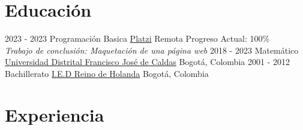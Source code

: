 \documentclass[letterpaper]{twentysecondcv} %
\begin{document}
\section{Educación}

\begin{twenty} %
	\twentyitem
    	{2023 - 2023}
        {Programación Basica}
        {\href{https://platzi.com/}{Platzi}}
        {Remota}
        {Progreso Actual: 100\% \\ \textit{Trabajo de conclusión: Maquetación de una página web}}
	\twentyitem
    	{2018 - 2023}
        {Matemático}
        {\href{https://www.udistrital.edu.co/inicio}{Universidad Distrital Francisco José de Caldas}}
        {Bogotá, Colombia}
        {}
	\twentyitem
    	{2001 - 2012}
        {Bachillerato}
        {\href{https://colegiosbogota.online/centro/colegio-reino-de-holanda/861}{I.E.D Reino de Holanda}}
        {Bogotá, Colombia}
        {}
\end{twenty}


\section{Experiencia}
\end{document}
